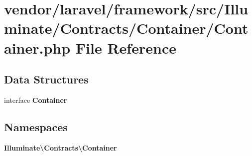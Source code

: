 \section{vendor/laravel/framework/src/\+Illuminate/\+Contracts/\+Container/\+Container.php File Reference}
\label{_contracts_2_container_2_container_8php}
\subsection*{Data Structures}
\begin{DoxyCompactItemize}
\item 
interface {\bf Container}
\end{DoxyCompactItemize}
\subsection*{Namespaces}
\begin{DoxyCompactItemize}
\item 
 {\bf Illuminate\textbackslash{}\+Contracts\textbackslash{}\+Container}
\end{DoxyCompactItemize}
